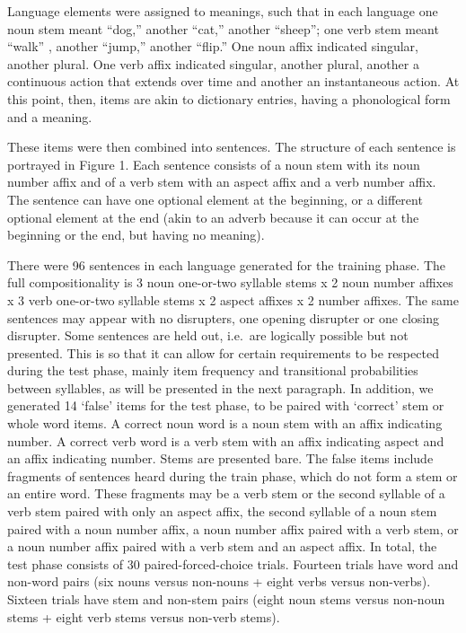 \documentclass[
  american,
  ,man,floatsintext]{apa6}
\begin{document}
Language elements were assigned to meanings, such that in each language one noun stem meant ``dog,'' another ``cat,'' another ``sheep''; one verb stem meant ``walk'' , another ``jump,'' another ``flip.'' One noun affix indicated singular, another plural. One verb affix indicated singular, another plural, another a continuous action that extends over time and another an instantaneous action. At this point, then, items are akin to dictionary entries, having a phonological form and a meaning.

These items were then combined into sentences. The structure of each sentence is portrayed in Figure 1. Each sentence consists of a noun stem with its noun number affix and of a verb stem with an aspect affix and a verb number affix. The sentence can have one optional element at the beginning, or a different optional element at the end (akin to an adverb because it can occur at the beginning or the end, but having no meaning).

There were 96 sentences in each language generated for the training phase. The full compositionality is 3 noun one-or-two syllable stems x 2 noun number affixes x 3 verb one-or-two syllable stems x 2 aspect affixes x 2 number affixes. The same sentences may appear with no disrupters, one opening disrupter or one closing disrupter. Some sentences are held out, i.e.~are logically possible but not presented. This is so that it can allow for certain requirements to be respected during the test phase, mainly item frequency and transitional probabilities between syllables, as will be presented in the next paragraph. In addition, we generated 14 `false' items for the test phase, to be paired with `correct' stem or whole word items. A correct noun word is a noun stem with an affix indicating number. A correct verb word is a verb stem with an affix indicating aspect and an affix indicating number. Stems are presented bare. The false items include fragments of sentences heard during the train phase, which do not form a stem or an entire word. These fragments may be a verb stem or the second syllable of a verb stem paired with only an aspect affix, the second syllable of a noun stem paired with a noun number affix, a noun number affix paired with a verb stem, or a noun number affix paired with a verb stem and an aspect affix. In total, the test phase consists of 30 paired-forced-choice trials. Fourteen trials have word and non-word pairs (six nouns versus non-nouns + eight verbs versus non-verbs). Sixteen trials have stem and non-stem pairs (eight noun stems versus non-noun stems + eight verb stems versus non-verb stems).
\end{document}
